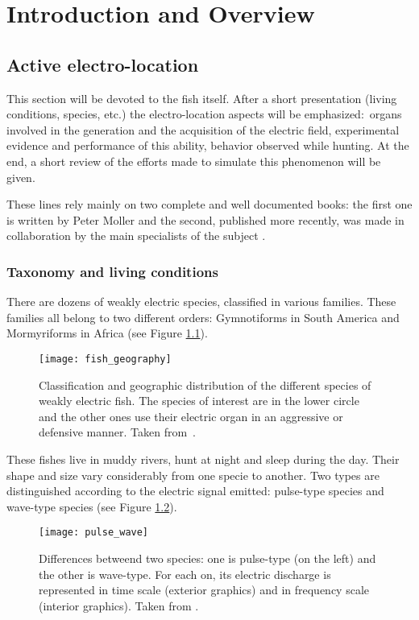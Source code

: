 \chapter{Introduction and Overview}

\section{Active electro-location}

\label{sec:presentation_poisson}

This section will be devoted to the fish itself. After a short
presentation (living conditions, species, etc.) the
electro-location aspects will be emphasized:~organs involved in
the generation and the acquisition of the electric field,
experimental evidence and performance of this ability, behavior
observed while hunting. At the end, a short review of the efforts
made to simulate this phenomenon will be given.

These lines rely mainly on two complete and well documented books:
the first one is written by Peter Moller
 and the second, published more
recently, was made in collaboration by the main specialists of the
subject \cite{bullock2005electroreception}.


\subsection{Taxonomy and living conditions}

There are dozens of weakly electric species, classified in various
families. These families all belong to two different orders: Gymnotiforms
in South America and Mormyriforms in Africa (see Figure \ref{fig:geography}).
%
\begin{figure}[!h]
 \centering \texttt{[image: fish\_geography]} \caption{Classification and geographic distribution
 of the different species
of weakly electric fish. The species of interest are in the lower
circle and the other ones use their electric organ in an
aggressive or defensive manner. Taken
from~\cite{moller1995electric}. \label{fig:geography}}

\end{figure}


These fishes live in muddy rivers, hunt at night and sleep during
the day. Their shape and size vary considerably from one specie to
another. Two types are distinguished according to the electric signal
emitted: pulse-type species and wave-type species (see Figure \ref{fig:pulse_wave}).
%
\begin{figure}[!h]
 \centering \texttt{[image: pulse\_wave]} \caption{Differences betweend two species: one
 is pulse-type (on the left)
and the other is wave-type. For each on, its electric discharge is
represented in time scale (exterior graphics) and in frequency scale
(interior graphics). Taken from \cite{heiligenberg1991neural}. \label{fig:pulse_wave}}

\end{figure}



